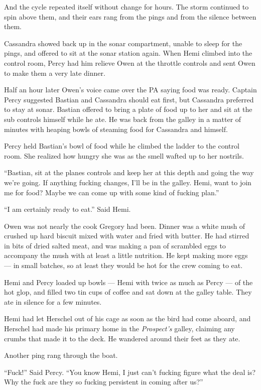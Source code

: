 \documentclass[]{scrbook}
\begin{document}
And the cycle repeated itself without change for hours. The storm
continued to spin above them, and their ears rang from the pings and
from the silence between them.

Cassandra showed back up in the sonar compartment, unable to sleep for
the pings, and offered to sit at the sonar station again. When Hemi
climbed into the control room, Percy had him relieve Owen at the
throttle controls and sent Owen to make them a very late dinner.

Half an hour later Owen's voice came over the PA saying food was ready.
Captain Percy suggested Bastian and Cassandra should eat first, but
Cassandra preferred to stay at sonar. Bastian offered to bring a plate
of food up to her and sit at the sub controls himself while he ate. He
was back from the galley in a matter of minutes with heaping bowls of
steaming food for Cassandra and himself.

Percy held Bastian's bowl of food while he climbed the ladder to the
control room. She realized how hungry she was as the smell wafted up to
her nostrils.

``Bastian, sit at the planes controls and keep her at this depth and
going the way we're going. If anything fucking changes, I'll be in the
galley. Hemi, want to join me for food? Maybe we can come up with some
kind of fucking plan.''

``I am certainly ready to eat.'' Said Hemi.

Owen was not nearly the cook Gregory had been. Dinner was a white mush
of crushed up hard biscuit mixed with water and fried with butter. He
had stirred in bits of dried salted meat, and was making a pan of
scrambled eggs to accompany the mush with at least a little nutrition.
He kept making more eggs --- in small batches, so at least they would be
hot for the crew coming to eat.

Hemi and Percy loaded up bowls --- Hemi with twice as much as Percy ---
of the hot glop, and filled two tin cups of coffee and sat down at the
galley table. They ate in silence for a few minutes.

Hemi had let Herschel out of his cage as soon as the bird had come
aboard, and Herschel had made his primary home in the \emph{Prospect's}
galley, claiming any crumbs that made it to the deck. He wandered around
their feet as they ate.

Another ping rang through the boat.

``Fuck!'' Said Percy. ``You know Hemi, I just can't fucking figure what
the deal is? Why the fuck are they so fucking persistent in coming after
us?''
\end{document}
